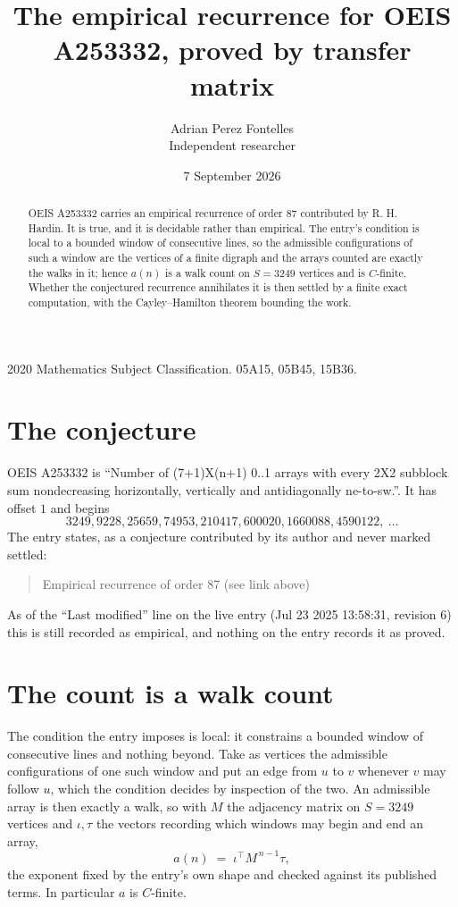 \documentclass[11pt,a4paper]{article}
\title{The empirical recurrence for OEIS A253332, proved by transfer matrix}
\author{Adrian Perez Fontelles\\ \small Independent researcher}
\date{7 September 2026}
\theoremstyle{plain}
\theoremstyle{definition}
\begin{document}
\maketitle

\begin{abstract}
OEIS A253332 carries an empirical recurrence of order $87$ contributed by R. H. Hardin. It is
true, and it is decidable rather than empirical. The entry's condition is local to a bounded window of consecutive lines, so
the admissible configurations of such a window are the vertices of a finite digraph and the
arrays counted are exactly the walks in it; hence $a(n)$ is a walk count on $S=3249$ vertices
and is $C$-finite. Whether the conjectured recurrence annihilates it is then settled by a
finite exact computation, with the Cayley--Hamilton theorem bounding the work.
\end{abstract}

\noindent\small 2020 Mathematics Subject Classification. 05A15, 05B45, 15B36.\normalsize

\section{The conjecture}

OEIS A253332 is ``Number of (7+1)X(n+1) 0..1 arrays with every 2X2 subblock sum nondecreasing horizontally, vertically and antidiagonally ne-to-sw.''. It has offset $1$ and begins
\[
3249, 9228, 25659, 74953, 210417, 600020, 1660088, 4590122,\ \dots
\]
The entry states, as a conjecture contributed by its author and never marked settled:
\begin{quote}
Empirical recurrence of order 87 (see link above)
\end{quote}
As of the ``Last modified'' line on the live entry (Jul 23 2025 13:58:31, revision 6) this is still
recorded as empirical, and nothing on the entry records it as proved.

\section{The count is a walk count}

The condition the entry imposes is local: it constrains a bounded window of consecutive lines and nothing beyond. Take as
vertices the admissible configurations of one such window and put an edge from $u$ to $v$
whenever $v$ may follow $u$, which the condition decides by inspection of the two. An
admissible array is then exactly a walk, so with $M$ the adjacency matrix on $S=3249$ vertices
and $\iota,\tau$ the vectors recording which windows may begin and end an array,
\[
a(n)\;=\;\iota^{\!\top}M^{\,n-1}\tau ,
\]
the exponent fixed by the entry's own shape and checked against its published terms. In
particular $a$ is $C$-finite.
\end{document}
